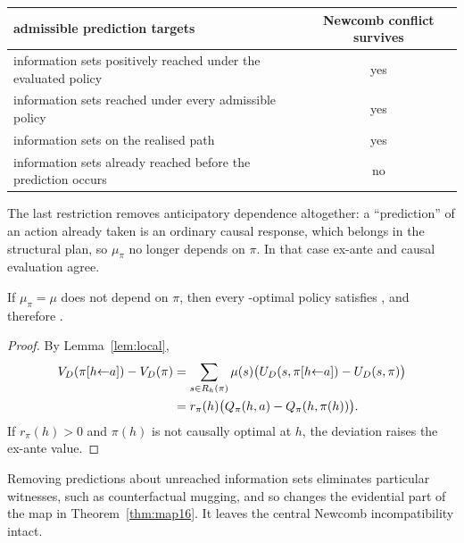 \begin{center}
\small
\begin{tabular}{@{}>{\raggedright\arraybackslash}p{19em}c@{}}
  \toprule
  admissible prediction targets & Newcomb conflict survives \\
  \midrule
  information sets positively reached under the evaluated policy & yes \\
  information sets reached under every admissible policy & yes \\
  information sets on the realised path & yes \\
  information sets already reached before the prediction occurs & no \\
  \bottomrule
\end{tabular}
\end{center}

The last restriction removes anticipatory dependence altogether: a \enquote{prediction} of an action
already taken is an ordinary causal response, which belongs in the structural plan, so $\mu_\pi$ no
longer depends on $\pi$. In that case ex-ante and causal evaluation agree.

\begin{proposition}\label{prop:causaltree}
If $\mu_\pi=\mu$ does not depend on $\pi$, then every -optimal policy satisfies ,
and therefore .
\end{proposition}

\begin{proof}
By Lemma~\ref{lem:local},
\begin{align*}
  V_D(\pi[h{\leftarrow}a])-V_D(\pi)
  &=\sum_{s\in R_h(\pi)}\mu(s)\bigl(U_D(s,\pi[h{\leftarrow}a])-U_D(s,\pi)\bigr)\\
  &=r_\pi(h)\bigl(Q_\pi(h,a)-Q_\pi(h,\pi(h))\bigr).
\end{align*}
If $r_\pi(h)>0$ and $\pi(h)$ is not causally optimal at $h$, the deviation raises the ex-ante value.
\end{proof}

Removing predictions about unreached information sets eliminates particular witnesses, such as
counterfactual mugging, and so changes the evidential part of the map in Theorem~\ref{thm:map16}.
It leaves the central Newcomb incompatibility intact.

